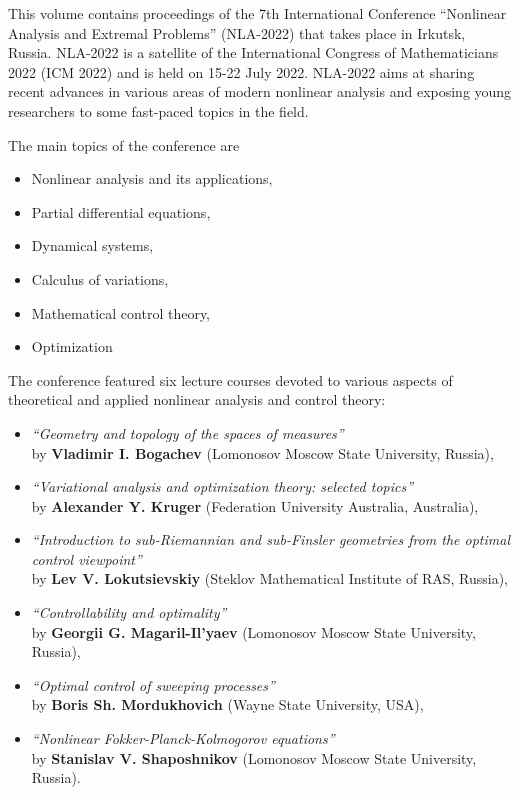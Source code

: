 \documentclass[12pt,final]{llncs}
\begin{document}
 \begin{englisharticle}

This volume contains proceedings of the 7th  International Conference ``Nonlinear Analysis and Extremal Problems'' (NLA-2022) that takes place in Irkutsk, Russia. NLA-2022 is a satellite of the International Congress of Mathematicians 2022 (ICM 2022) and is held on 15-22 July 2022. NLA-2022 aims at sharing recent advances in various areas of modern nonlinear analysis and exposing young researchers to some fast-paced topics in the field.

The main topics of the  conference are
\begin{itemize}
\item Nonlinear analysis and its applications,
\item Partial differential equations,
\item Dynamical systems,
\item Calculus of variations,
\item Mathematical control theory,
\item Optimization
\end{itemize}
The conference featured six lecture courses devoted to various aspects of theoretical and applied nonlinear analysis and control theory:
\begin{itemize}
\item \emph{``Geometry and topology of the spaces of measures''}\\ by  \textbf{Vladimir I. Bogachev} (Lomonosov Moscow State University, Russia),\smallskip
\item \emph{``Variational analysis and optimization theory: selected topics''}\\ by \textbf{Alexander Y. Kruger} (Federation University Australia, Australia),\smallskip
\item \emph{``Introduction to sub-Riemannian and sub-Finsler geometries from the optimal control viewpoint''}\\ by  \textbf{Lev V. Lokutsievskiy} (Steklov Mathematical Institute of RAS, Russia),
\item \emph{``Controllability and optimality''}\\ by \textbf{Georgii G. Magaril-Il'yaev} (Lomonosov Moscow State University, Russia),
\item \emph{``Optimal control of sweeping processes''}\\ by \textbf{Boris Sh. Mordukhovich} (Wayne State University, USA),
\item \emph{``Nonlinear Fokker-Planck-Kolmogorov equations''}\\ by \textbf{Stanislav V. Shaposhnikov} (Lomonosov Moscow State University, Russia).\smallskip
\end{itemize}








 \end{englisharticle}
\end{document}
